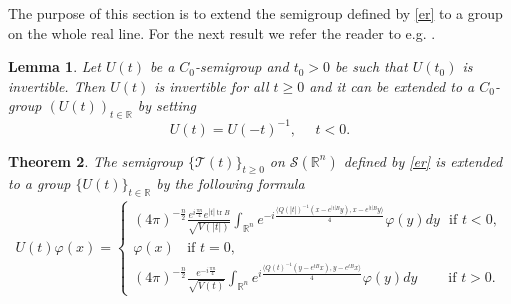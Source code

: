 \documentclass[11pt,letter]{amsart}
\def \phi {\varphi}
\def \R {\mathbb{R}}
\newcommand{\Rn}{\mathbb R^n}
\numberwithin{equation}{section}
\newcommand{\tr}{\operatorname{tr}}
\newtheorem{theorem}{Theorem}[section]
\newtheorem{lemma}[theorem]{Lemma}
\numberwithin{equation}{section}
\begin{document}
The purpose of this section is to extend the semigroup defined by \eqref{er} to a group on the whole real line. 
For the next result we refer the reader to e.g. \cite[Lemma 4.1]{HMMS}. 


\begin{lemma}\label{LemmaExpansion}
Let $U(t)$ be a $C_{0}$-semigroup and $t_{0}>0$ be such that $U(t_{0})$ is invertible. Then $U(t)$ is invertible for all $t\ge 0$ and it can be extended to a $C_{0}$-group $(U(t))_{t\in \mathbb{R}}$ by setting
\[
U(t)=U(-t)^{-1}, \ \ \ \ \ \ t<0.
\]
\end{lemma}

\begin{theorem}\label{ExtendingProp}
The semigroup $\{\mathcal T(t)\}_{t\ge 0}$ on $\mathscr S(\Rn)$ defined by \eqref{er} is extended  to a group $\{U(t)\}_{t\in \R}$ by the following formula
\begin{align}\label{ExtendedSemigroup}
U(t)\phi(x)=\begin{cases}
(4\pi)^{-\frac{n}{2}}\frac{e^{i\frac{\pi n}{4}} e^{|t| \tr B}}{\sqrt{V(|t|)}}\int_{\Rn}e^{-i\frac{\langle Q(|t|)^{-1}(x-e^{|t|B}y),x-e^{|t|B} y\rangle}{4}}\phi(y)dy \ \ \ \text{if }t<0,
\\
\phi(x) \ \ \ \ \text{if }t=0,
\\
(4\pi)^{-\frac{n}{2}}\frac{e^{-i\frac{\pi n}{4}}}{\sqrt{V(t)}}\int_{\Rn}e^{i\frac{\langle Q(t)^{-1}(y-e^{tB}x),y-e^{tB}x\rangle}{4}}\phi(y)dy \ \ \ \ \ \ \ \ \ \ \text{if }t>0.
\end{cases}
\end{align}
\end{theorem}
\end{document}
